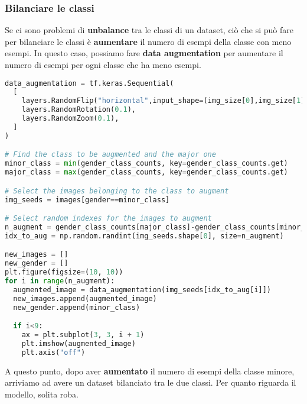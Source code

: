 \subsubsection{Bilanciare le classi}

Se ci sono problemi di \textbf{unbalance} tra le classi di un dataset, ciò che si può fare per bilanciare 
le classi è \textbf{aumentare} il numero di esempi della classe con meno esempi. In questo caso,
possiamo fare \textbf{data augmentation} per aumentare il numero di esempi per ogni classe che 
ha meno esempi.

\begin{lstlisting}[language=Python, caption=Data augmentation]
data_augmentation = tf.keras.Sequential(
  [
    layers.RandomFlip("horizontal",input_shape=(img_size[0],img_size[1],3)),
    layers.RandomRotation(0.1),
    layers.RandomZoom(0.1),
  ]
)

# Find the class to be augmented and the major one
minor_class = min(gender_class_counts, key=gender_class_counts.get)
major_class = max(gender_class_counts, key=gender_class_counts.get)

# Select the images belonging to the class to augment
img_seeds = images[gender==minor_class]

# Select random indexes for the images to augment
n_augment = gender_class_counts[major_class]-gender_class_counts[minor_class]
idx_to_aug = np.random.randint(img_seeds.shape[0], size=n_augment)

new_images = []
new_gender = []
plt.figure(figsize=(10, 10))
for i in range(n_augment):
  augmented_image = data_augmentation(img_seeds[idx_to_aug[i]])
  new_images.append(augmented_image)
  new_gender.append(minor_class)

  if i<9:
    ax = plt.subplot(3, 3, i + 1)
    plt.imshow(augmented_image)
    plt.axis("off")
\end{lstlisting}

A questo punto, dopo aver \textbf{aumentato} il numero di esempi della classe minore, arriviamo ad avere 
un dataset bilanciato tra le due classi. Per quanto riguarda il modello, solita roba.

